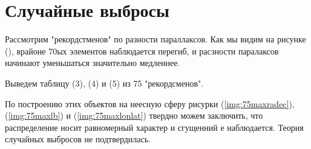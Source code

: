 \documentclass[14pt]{article} %
\begin{document}
\section{Случайные выбросы}\label{sub:smthrs}

Рассмотрим "рекордстменов" по разности параллаксов.
Как мы видим на рисунке (), врайоне 70ых элементов наблюдается перегиб, и расзности паралаксов начинают уменьшаться значительно медленнее.

Выведем таблицу (3), (4) и (5) из 75 "рекордсменов".

По построению этих объектов на неесную сферу рисурки (\ref{img:75maxradec}), (\ref{img:75maxlb}) и (\ref{img:75maxlonlat}) твердно можем заключить, что распределение носит равномерный характер и сгущенний е наблюдается. Теория случайных выбросов не подтвердилась.
 
\end{document}
